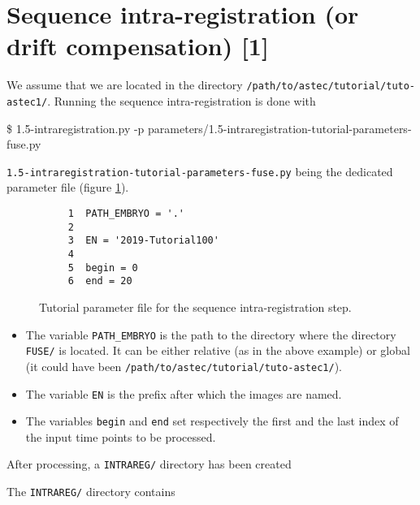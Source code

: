 \section{Sequence intra-registration (or drift compensation) [1]}
\label{sec:tutorial:intra:registration:fuse}

We assume that we are located in the directory
\texttt{/path/to/astec/tutorial/tuto-astec1/}. Running the sequence intra-registration is
done with
\begin{code}{0.8}
  \$ 1.5-intraregistration.py -p parameters/1.5-intraregistration-tutorial-parameters-fuse.py 
\end{code}
\texttt{1.5-intraregistration-tutorial-parameters-fuse.py} being the
dedicated parameter file  (figure \ref{fig:tutorial:parameter:intra:registration:fuse}).

\begin{figure}
\begin{framed}
\begin{verbatim}
     1	PATH_EMBRYO = '.'
     2	
     3	EN = '2019-Tutorial100'
     4	
     5	begin = 0
     6	end = 20
\end{verbatim}
\end{framed}
\caption{\label{fig:tutorial:parameter:intra:registration:fuse} Tutorial
  parameter file for the sequence intra-registration step.}
\end{figure}

\begin{itemize}
  \itemsep -0.5ex
  \item The variable \texttt{PATH\_EMBRYO} is the path to the directory where
    the directory \texttt{FUSE/} is located. It can be either relative (as in the
    above example) or
    global (it could have been \texttt{/path/to/astec/tutorial/tuto-astec1/}).
  \item The variable \texttt{EN} is the prefix after which the  images
    are named. 
  \item The variables \texttt{begin} and \texttt{end} set respectively the
    first and the last index of the input time points to be processed.
\end{itemize}

After processing, a \texttt{INTRAREG/} directory has been created

\mbox{}
\mbox{}

The \texttt{INTRAREG/} directory contains

